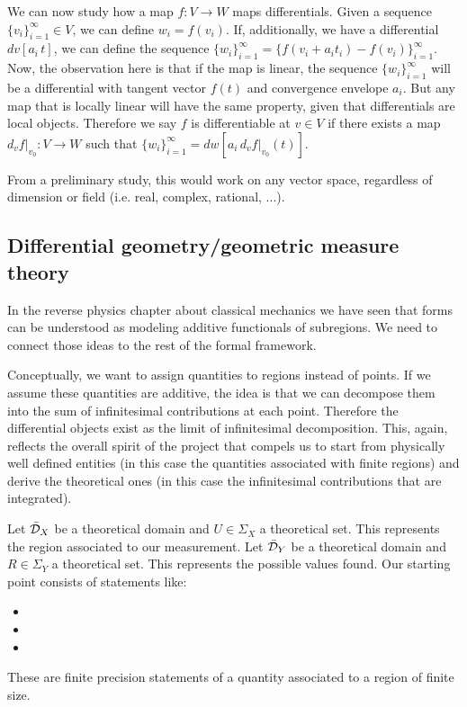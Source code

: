 \documentclass[11pt,letterpaper,fleqn]{memoir} %
\begin{document}
We can now study how a map $f: V \to W$ maps differentials. Given a sequence  $\{v_i\}_{i=1}^{\infty} \in V$, we can define $w_i = f(v_i)$. If, additionally, we have a differential $dv[a_i \, t]$, we can define the sequence $\{w_i\}_{i=1}^{\infty} = \{f(v_i + a_i t_i) - f(v_i)\}_{i=1}^{\infty}$. Now, the observation here is that if the map is linear, the sequence $\{w_i\}_{i=1}^{\infty}$ will be a differential with tangent vector $f(t)$ and convergence envelope $a_i$. But any map that is locally linear will have the same property, given that differentials are local objects. Therefore we say $f$ is differentiable at $v \in V$ if there exists a map $d_v f |_{v_0} : V \to W$ such that $\{w_i\}_{i=1}^{\infty} = dw[a_i \, d_v f |_{v_0}(t)]$.

From a preliminary study, this would work on any vector space, regardless of dimension or field (i.e. real, complex, rational, ...).

\subsection{Differential geometry/geometric measure theory}

In the reverse physics chapter about classical mechanics we have seen that forms can be understood as modeling additive functionals of subregions. We need to connect those ideas to the rest of the formal framework.

Conceptually, we want to assign quantities to regions instead of points. If we assume these quantities are additive, the idea is that we can decompose them into the sum of infinitesimal contributions at each point. Therefore the differential objects exist as the limit of infinitesimal decomposition. This, again, reflects the overall spirit of the project that compels us to start from physically well defined entities (in this case the quantities associated with finite regions) and derive the theoretical ones (in this case the infinitesimal contributions that are integrated).

Let $\bar{\mathcal{D}}_X$ be a theoretical domain and $U \in \Sigma_X$ a theoretical set. This represents the region associated to our measurement. Let $\bar{\mathcal{D}}_Y$ be a theoretical domain and $R \in \Sigma_Y$ a theoretical set. This represents the possible values found. Our starting point consists of statements like:
\begin{itemize}
	\item {}
	\item {}
	\item {}
\end{itemize}
These are finite precision statements of a quantity associated to a region of finite size.
\end{document}

